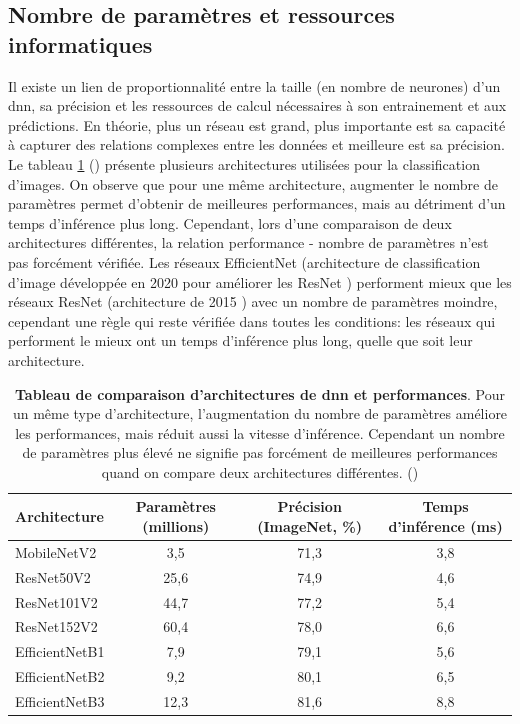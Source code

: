 \subsection{Nombre de paramètres et ressources informatiques}
Il existe un lien de proportionnalité entre la taille (en nombre de neurones) d'un \gls{dnn}, sa précision et les ressources de calcul nécessaires à son entrainement et aux prédictions. En théorie, plus un réseau est grand, plus importante est sa capacité à capturer des relations complexes entre les données et meilleure est sa précision. Le tableau \ref{table:dnn-size} (\cite{chollet_keras_2023}) présente plusieurs architectures utilisées pour la classification d'images. On observe que pour une même architecture, augmenter le nombre de paramètres permet d'obtenir de meilleures performances, mais au détriment d'un temps d'inférence plus long. Cependant, lors d'une comparaison de deux architectures différentes, la relation performance - nombre de paramètres n'est pas forcément vérifiée. Les réseaux EfficientNet (architecture de classification d'image développée en 2020 pour améliorer les ResNet \cite{tan_efficientnet_2020}) performent mieux que les réseaux ResNet (architecture de 2015 \cite{he_deep_2015}) avec un nombre de paramètres moindre, cependant une règle qui reste vérifiée dans toutes les conditions: les réseaux qui performent le mieux ont un temps d'inférence plus long, quelle que soit leur architecture.

\begin{table}[!htbp]
\centering
\begin{tabular}{|l|c|c|c|} 
 \hline
 Architecture & Paramètres (millions) & Précision (ImageNet, \%) & Temps d'inférence (ms) \\
 \hline
MobileNetV2 & 3,5 & 71,3 & 3,8 \\
\hline
ResNet50V2 & 25,6 & 74,9 & 4,6 \\ 
ResNet101V2 & 44,7 & 77,2 & 5,4 \\ 
ResNet152V2 & 60,4 & 78,0 & 6,6 \\
\hline
EfficientNetB1 & 7,9 & 79,1 & 5,6 \\
EfficientNetB2 & 9,2 & 80,1& 6,5 \\
EfficientNetB3 & 12,3 & 81,6 & 8,8 \\
 \hline
\end{tabular}
\caption[Tableau de comparaison d'architectures de \gls{dnn} et performances]{\textbf{Tableau de comparaison d'architectures de \gls{dnn} et performances}. Pour un même type d'architecture, l'augmentation du nombre de paramètres améliore les performances, mais réduit aussi la vitesse d'inférence. Cependant un nombre de paramètres plus élevé ne signifie pas forcément de meilleures performances quand on compare deux architectures différentes. (\cite{chollet_keras_2023})} 
\label{table:dnn-size}
\end{table}

